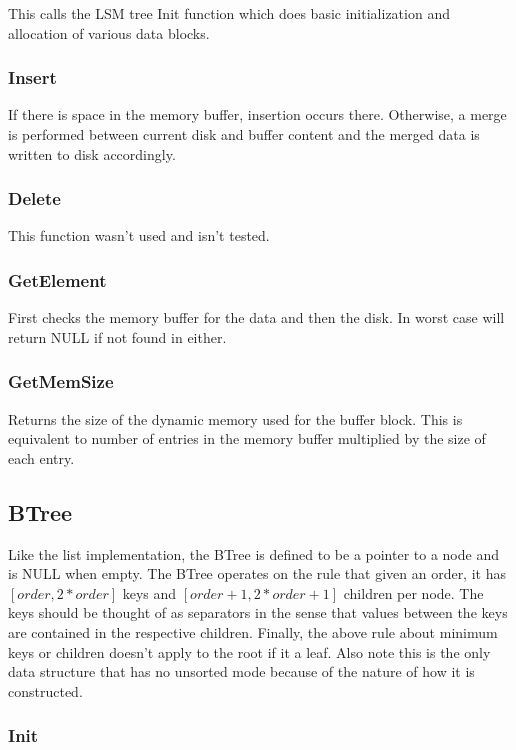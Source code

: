 \documentclass[twocolumn]{article}
\begin{document}
This calls the LSM tree Init function which does basic initialization and
allocation of various data blocks.

\subsubsection{Insert}

If there is space in the memory buffer, insertion occurs there. Otherwise, a
merge is performed between current disk and buffer content and the merged data
is written to disk accordingly.

\subsubsection{Delete}

This function wasn't used and isn't tested.

\subsubsection{GetElement}

First checks the memory buffer for the data and then the disk. In worst case
will return NULL if not found in either.

\subsubsection{GetMemSize}

Returns the size of the dynamic memory used for the buffer block. This is
equivalent to number of entries in the memory buffer multiplied by the size of
each entry.

\subsection{BTree}

Like the list implementation, the BTree is defined to be a pointer to a node and
is NULL when empty. The BTree operates on the rule that given an order, it has
$[order, 2 * order]$ keys and $[order + 1, 2 * order + 1]$ children per node.
The keys should be thought of as separators in the sense that values between the
keys are contained in the respective children. Finally, the above rule about
minimum keys or children doesn't apply to the root if it a leaf. Also note this
is the only data structure that has no unsorted mode because of the nature of
how it is constructed.

\subsubsection{Init}
\end{document}
